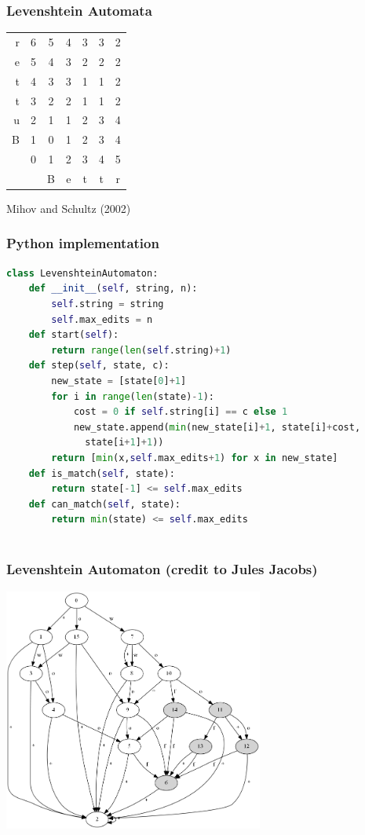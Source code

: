 \documentclass[10pt]{beamer}
\begin{document}
\begin{frame}[fragile]
  \frametitle{Levenshtein Automata}

  \pause

  \centering
\begin{tabular}{ r || c | c | c | c | c | c  }
  r & 6 & 5 & 4 & 3 & 3 & 2 \\
  e & 5 & 4 & 3 & 2 & 2 & 2 \\
  t & 4 & 3 & 3 & 1 & 1 & 2 \\ 
  t & 3 & 2 & 2 & 1 & 1 & 2 \\
  u & 2 & 1 & 1 & 2 & 3 & 4 \\
  B & 1 & 0 & 1 & 2 & 3 & 4 \\
    & 0 & 1 & 2 & 3 & 4 & 5 \\
  \hline
    &   & B & e & t & t & r \\
\end{tabular}

  Mihov and Schultz (2002)
\end{frame}


\begin{frame}[fragile]
  \frametitle{Python implementation}

  \begingroup
  \fontsize{8pt}{10pt}\selectfont
  \begin{lstlisting}[language=python]
  class LevenshteinAutomaton:
    def __init__(self, string, n):
        self.string = string
        self.max_edits = n
    def start(self):
        return range(len(self.string)+1)
    def step(self, state, c):
        new_state = [state[0]+1]
        for i in range(len(state)-1):
            cost = 0 if self.string[i] == c else 1
            new_state.append(min(new_state[i]+1, state[i]+cost, 
              state[i+1]+1))
        return [min(x,self.max_edits+1) for x in new_state]
    def is_match(self, state):
        return state[-1] <= self.max_edits
    def can_match(self, state):
        return min(state) <= self.max_edits



  \end{lstlisting}  
  \endgroup
\end{frame}

\begin{frame}[fragile]
  \frametitle{Levenshtein Automaton (credit to Jules Jacobs)}


  \centerline{\includegraphics[height=8cm]{levautomaton.png}}  
\end{frame}
\end{document}

